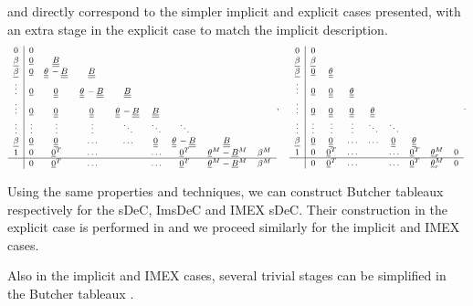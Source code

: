 and directly correspond to the simpler implicit and explicit cases presented, with an extra stage in the explicit case to match the implicit description. 
\begin{equation}\label{eq:IMEX_DeC_RK}
\footnotesize
\begin{aligned}
\begin{array}{c|ccccccccc}
0 & 0 &   & &  & & &  & \\
\vec{\beta} & \vec{0} & \mat{B}  &   & & & & &  \\
\vec{\beta}  & \vec{0} &   \mat{{\theta}}-\mat{B} &\mat{B} & & & & &\\
\vdots & \vec{0} & \mat{0}  &\mat{{\theta}}-\mat{B} &\mat{B}& & & &\\
\vdots & \vec{0} &  \mat{0}   &   \mat{0}  & \mat{{\theta}}-\mat{B} &\mat{B}  &  & &\\
\vdots &  \vdots  &  \vdots &  \vdots &  \ddots  &  \ddots& \ddots & & \\
\vec{\beta} & \vec{0} &  \mat{0}  &  \hdots &  \hdots & \mat{0}  &  \mat{{\theta}}-\mat{B} &\mat{B} & \\
1&  0 & \vec{0}^T    & \hdots  &   &   \hdots &    \vec{0}^T& \vec{{\theta}}^M-\vec{B}^M &\beta^M \\
\hline
&  0& \vec{0}^T    & \hdots  &   &   \hdots &\vec{0}^T &   \vec{{\theta}}^M-\vec{B}^M &\beta^M
\end{array},
\quad
\begin{array}{c|ccccccccc}
0 & 0 &   & &  & & &  & \\
\vec{\beta} & \vec{\beta} &  &   & & & & &  \\
\vec{\beta}  & \vec{0} &   \mat{{\theta}} & & & & & &\\
\vdots & \vec{0} & \mat{0}  &\mat{{\theta}}   && & & &\\
\vdots & \vec{0} &  \mat{0}   &   \mat{0}  & \mat{{\theta}}  &  &  & &\\
\vdots &  \vdots  &  \vdots &  \vdots &  \ddots  &  \ddots& & & \\
\vec{\beta} & \vec{0} &  \mat{0}  &  \hdots &  \hdots & \mat{0}  &  \mat{{\theta}} & \\
1&  0 & \vec{0}^T    & \hdots  &   &   \hdots &    \vec{0}^T& \vec{\theta}_r^{M}& 0 \\
\hline
&  0 & \vec{0}^T    & \hdots  &   &   \hdots &    \vec{0}^T& \vec{\theta}_r^{M} & 0
\end{array}.
\end{aligned}
\end{equation}
\begin{remark}
	Using the same properties and techniques, we can construct Butcher tableaux respectively for the sDeC, ImsDeC and IMEX sDeC. Their construction in the explicit case is performed in \cite{torlo2022} and we proceed similarly for the implicit and IMEX cases.
\end{remark}
Also in the implicit and IMEX cases, several trivial stages can be simplified in the Butcher tableaux \cite{torlo2022}.